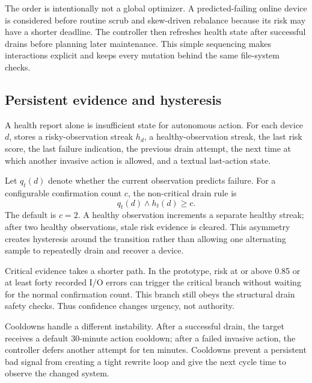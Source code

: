The order is intentionally not a global optimizer. A predicted-failing online device is considered before routine scrub and skew-driven rebalance because its risk may have a shorter deadline. The controller then refreshes health state after successful drains before planning later maintenance. This simple sequencing makes interactions explicit and keeps every mutation behind the same file-system checks.

\subsection{Persistent evidence and hysteresis}
\label{sec:evidence}
A health report alone is insufficient state for autonomous action. For each device $d$, \autopilot{} stores a risky-observation streak $h_d$, a healthy-observation streak, the last risk score, the last failure indication, the previous drain attempt, the next time at which another invasive action is allowed, and a textual last-action state.

Let $q_t(d)$ denote whether the current observation predicts failure. For a configurable confirmation count $c$, the non-critical drain rule is
\begin{equation}
  q_t(d) \land h_t(d) \ge c.
  \label{eq:confirmation}
\end{equation}
The default is $c=2$. A healthy observation increments a separate healthy streak; after two healthy observations, stale risk evidence is cleared. This asymmetry creates hysteresis around the transition rather than allowing one alternating sample to repeatedly drain and recover a device.

Critical evidence takes a shorter path. In the prototype, risk at or above 0.85 or at least forty recorded I/O errors can trigger the critical branch without waiting for the normal confirmation count. This branch still obeys the structural drain safety checks. Thus confidence changes urgency, not authority.

Cooldowns handle a different instability. After a successful drain, the target receives a default 30-minute action cooldown; after a failed invasive action, the controller defers another attempt for ten minutes. Cooldowns prevent a persistent bad signal from creating a tight rewrite loop and give the next cycle time to observe the changed system.

